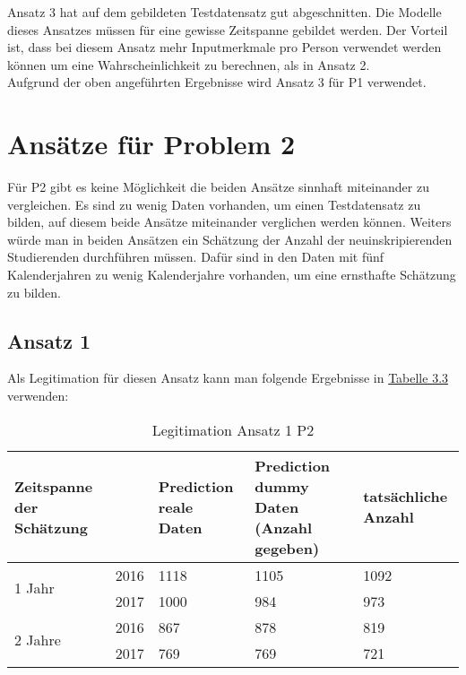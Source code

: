 Ansatz 3 hat auf dem gebildeten Testdatensatz gut abgeschnitten. Die Modelle dieses Ansatzes m\"ussen f\"ur eine gewisse Zeitspanne gebildet werden. Der Vorteil ist, dass 
bei diesem Ansatz mehr Inputmerkmale pro Person verwendet werden k\"onnen um eine Wahrscheinlichkeit zu berechnen, als in Ansatz 2. \\

Aufgrund der oben angef\"uhrten Ergebnisse wird Ansatz 3 f\"ur P1 verwendet. \\








\section{Ans\"atze f\"ur Problem 2}
F\"ur P2 gibt es keine M\"oglichkeit die beiden Ans\"atze sinnhaft miteinander zu vergleichen. Es sind zu wenig Daten vorhanden, 
um einen Testdatensatz zu bilden, auf diesem beide Ans\"atze miteinander verglichen werden k\"onnen. Weiters w\"urde man in beiden 
Ans\"atzen ein Sch\"atzung der Anzahl der neuinskripierenden Studierenden durchf\"uhren m\"ussen. Daf\"ur sind in den Daten mit f\"unf Kalenderjahren 
zu wenig Kalenderjahre vorhanden, um eine ernsthafte Sch\"atzung zu bilden. 


\subsection{Ansatz 1}
Als Legitimation f\"ur diesen Ansatz kann man folgende Ergebnisse in \hyperref[tab:legitimationA1P2]{Tabelle 3.3} verwenden: 

\begin{table}[ht]
    \caption{\label{tab:legitimationA1P2} Legitimation Ansatz 1 P2}
    \begin{tabular}{ p{2.5cm} p{1cm} p{3cm} p{3cm} p{3cm} }
      \toprule
      Zeitspanne der Sch\"atzung& & Prediction reale Daten & Prediction dummy Daten (Anzahl gegeben) & tats\"achliche Anzahl \\
      \midrule
      \multirow{2}{3em}{1 Jahr}
      & 2016 & 1118 & 1105 & 1092 \\
      & 2017 & 1000 & 984 & 973 \\
        \midrule 
      \multirow{2}{4em}{2 Jahre}
      & 2016 & 867 & 878 & 819 \\
      & 2017 & 769 & 769 & 721 \\
      
      \bottomrule
      
    \end{tabular}
    
\end{table} 

